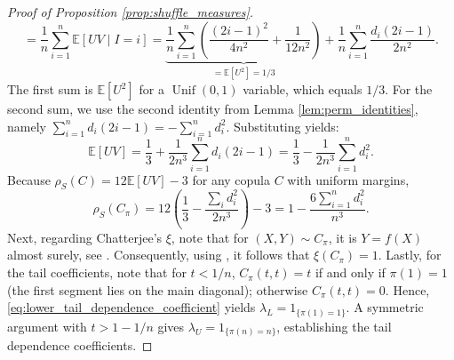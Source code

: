 \documentclass{article}
\theoremstyle{definition}
\begin{document}
\begin{proof}[Proof of Proposition \ref{prop:shuffle_measures}]
\[        = \frac1{n}\sum_{i=1}^{n}\mathbb{E}[UV\mid I=i]
        = \underbrace{\frac1{n}\sum_{i=1}^{n} \left(\frac{(2i-1)^{2}}{4n^{2}} +\frac{1}{12n^{2}}\right)}_{\displaystyle =\mathbb{E}[U^2]=1/3} + \frac1{n}\sum_{i=1}^{n}\frac{d_i(2i-1)}{2n^{2}}.
    \]
    The first sum is $\mathbb{E}[U^2]$ for a $\operatorname{Unif}(0,1)$ variable, which equals $1/3$. 
    For the second sum, we use the second identity from Lemma \ref{lem:perm_identities}, namely $\sum_{i=1}^{n} d_i(2i-1) = -\sum_{i=1}^{n} d_i^{2}$. 
    Substituting yields:
    \[
        \mathbb{E}[UV] 
        = \frac13 + \frac{1}{2n^3} \sum_{i=1}^{n} d_i(2i-1) 
        = \frac13 - \frac{1}{2n^3} \sum_{i=1}^{n} d_i^2.
    \]
    Because $\rho_S(C)=12\mathbb{E}[UV]-3$ for any copula $C$ with uniform margins,
    \[
        \rho_S(C_\pi)
        = 12\left(\frac13-\frac{\sum_{i}d_i^{2}}{2n^{3}}\right)-3
        = 1-\frac{6\sum_{i=1}^{n}d_i^{2}}{n^3}.
    \]
    Next, regarding Chatterjee’s $\xi$, note that for $(X,Y)\sim C_{\pi}$, it is $Y=f(X)$ almost surely, see \cite[Theorem 2.1]{mikusinski1992shuffles}.
    Consequently, using \cite[Theorem 2.1]{ansarifuchs2022asimpleextension}, it follows that $\xi(C_\pi)=1$.
    Lastly, for the tail coefficients, note that for $t<1/n$, $C_\pi(t,t)=t$ if and only if $\pi(1)=1$ (the first segment lies on the main diagonal); otherwise $C_\pi(t,t)=0$.
    Hence, \eqref{eq:lower_tail_dependence_coefficient} yields $\lambda_L=1_{\{\pi(1)=1\}}$.
    A symmetric argument with $t>1-1/n$ gives $\lambda_U=1_{\{\pi(n)=n\}}$, establishing the tail dependence coefficients.
\end{proof}
\end{document}
